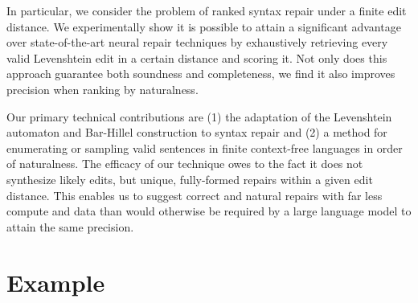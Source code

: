 In particular, we consider the problem of ranked syntax repair under a finite edit distance. We experimentally show it is possible to attain a significant advantage over state-of-the-art neural repair techniques by exhaustively retrieving every valid Levenshtein edit in a certain distance and scoring it. Not only does this approach guarantee both soundness and completeness, we find it also improves precision when ranking by naturalness.

Our primary technical contributions are (1) the adaptation of the Levenshtein automaton and Bar-Hillel construction to syntax repair and (2) a method for enumerating or sampling valid sentences in finite context-free languages in order of naturalness. The efficacy of our technique owes to the fact it does not synthesize likely edits, but unique, fully-formed repairs within a given edit distance. This enables us to suggest correct and natural repairs with far less compute and data than would otherwise be required by a large language model to attain the same precision.

\section{Example}\label{sec:example}

